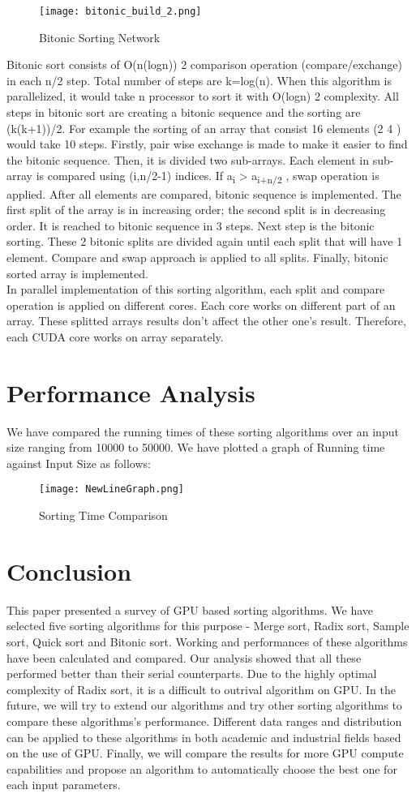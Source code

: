 \documentclass[conference]{IEEEtran}
\begin{document}
\begin{figure}[h]
\texttt{[image: bitonic\_build\_2.png]}
\caption{Bitonic Sorting Network}
\end{figure}
Bitonic sort consists of O(n(logn)) 2 comparison operation
(compare/exchange) in each n/2 step. Total number of steps
are k=log(n). When this algorithm is parallelized, it would
take n processor to sort it with O(logn) 2 complexity. All steps
in bitonic sort are creating a bitonic sequence and the sorting
are (k(k+1))/2. For example the sorting of an array that consist
16 elements (2 4 ) would take 10 steps. Firstly, pair wise exchange is made to
make it easier to find the bitonic sequence. Then, it is divided
two sub-arrays. Each element in sub-array is compared using
(i,n/2-1) indices. If a\textsubscript{i} > a\textsubscript{i+n/2} , swap operation is applied. After
all elements are compared, bitonic sequence is implemented.
The first split of the array is in increasing order; the second
split is in decreasing order. It is reached to bitonic sequence in
3 steps. Next step is the bitonic sorting. These 2 bitonic splits
are divided again until each split that will have 1 element.
Compare and swap approach is applied to all splits. Finally,
bitonic sorted array is implemented.\\

In parallel implementation of this sorting algorithm, each
split and compare operation is applied on different cores. Each
core works on different part of an array. These splitted arrays
results don't affect the other one's result. Therefore, each
CUDA core works on array separately.

\section{Performance Analysis}
We have compared the running times of these sorting algorithms over an input size ranging from 10000 to 50000. We have plotted a graph of Running time against Input Size as follows:
\begin{figure}[h]
\texttt{[image: NewLineGraph.png]}
\caption{Sorting Time Comparison}
\end{figure}
\section{Conclusion}
This paper presented a survey of GPU based sorting algorithms. We have selected five sorting algorithms for this purpose - Merge sort, Radix sort, Sample sort, Quick sort and Bitonic sort. Working and performances of these algorithms have been calculated and compared. Our analysis showed that all these performed better than their serial counterparts. Due to the highly
optimal complexity of Radix sort, it is a difficult to outrival algorithm on GPU. In the future, we will try to extend our algorithms
and try other sorting algorithms to compare these algorithms’s
performance. Different data ranges and distribution can be
applied to these algorithms in both academic and industrial
fields based on the use of GPU. Finally, we will compare the results for
more GPU compute capabilities and propose an algorithm to
automatically choose the best one for each input parameters.
\end{document}
